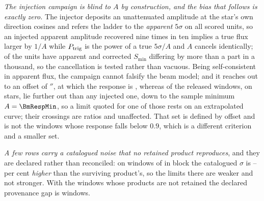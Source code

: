 \emph{The injection campaign is blind to $A$ by construction, and the bias
that follows is exactly zero.} The injector deposits an unattenuated amplitude
at the star's own direction cosines and refers the ladder to the
\emph{apparent} $5\sigma$ on all \PbInjNUnit{} scored units, so an injected
apparent amplitude recovered nine times in ten implies a true flux larger by
$1/A$ while $P_{\rm trig}$ is the power of a true $5\sigma/A$ and $A$ cancels
identically; \PbInjNDistinct{} of the units have apparent and corrected
$S_{\min}$ differing by more than a part in a thousand, so the cancellation
is tested rather than vacuous. Being self-consistent in apparent flux, the
campaign cannot falsify the beam model; and it reaches out to an offset of
\PbInjOffMax$''$, at which the response is \PbInjAMin, whereas \PbNBeyond{}
of the \PbNWin{} released windows, on \PbNBeyondStar{} stars, lie further out
than any injected one, down to the sample minimum $A=\BmRespMin$, so a limit
quoted for one of those rests on an extrapolated curve; their
\PbNBeyondCross{} crossings are ratios and unaffected. That set is defined by
offset and is not the \BmNBelowNine{} windows whose response falls below
$0.9$, which is a different criterion and a smaller set.

\emph{A few rows carry a catalogued noise that no retained product
reproduces}, and they are declared rather than reconciled: on \PbGapN{}
windows of \PbGapStar{} in block \texttt{\PbGapEb} the catalogued $\sigma$ is
\PbGapPctLo--\PbGapPctHi{} per cent \emph{higher} than the surviving
product's, so the limits there are weaker and not stronger. With the
\PbGapNoProd{} windows whose products are not retained the declared
provenance gap is \PbGapDeclared{} windows.

